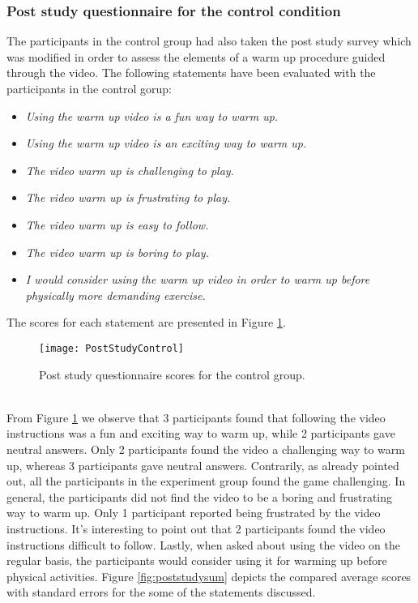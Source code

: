 \subsubsection{Post study questionnaire for the control condition} 
The participants in the control group had also taken the post study survey which was modified in order to assess the elements of a warm up procedure guided through the video. The following statements have been evaluated with the participants in the control gorup:
\begin{itemize}
\item \textit{Using the warm up video is a fun way to warm up.}
\item \textit{Using the warm up video is an exciting way to warm up.}
\item \textit{The video warm up is challenging to play.}
\item \textit{The video warm up is frustrating to play.}
\item \textit{The video warm up is easy to follow.}
\item \textit{The video warm up is boring to play.}
\item \textit{I would consider using the warm up video in order to warm up before physically more demanding exercise.}
\end{itemize}
The scores for each statement are presented in Figure \ref{fig:poststudycontrol}.\\
\begin{figure}[h]
    \centering
    \texttt{[image: PostStudyControl]}
    \caption{Post study questionnaire scores for the control group.}
    \label{fig:poststudycontrol}
\end{figure}\\
From Figure \ref{fig:poststudycontrol} we observe that 3 participants found that following the video instructions was a fun and exciting way to warm up, while 2 participants gave neutral answers. Only 2 participants found the video a challenging way to warm up, whereas 3 participants gave neutral answers. Contrarily, as already pointed out, all the participants in the experiment group found the game challenging. In general, the participants did not find the video to be a boring and frustrating way to warm up. Only 1 participant reported being frustrated by the video instructions. It's interesting to point out that 2 participants found the video instructions difficult to follow. Lastly, when asked about using the video on the regular basis, the participants would consider using it for warming up before physical activities. Figure \ref{fig:poststudysum} depicts the compared average scores with standard errors for the some of the statements discussed.\pagebreak
